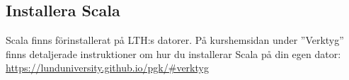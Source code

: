 \subsection{Installera Scala}

Scala finns förinstallerat på LTH:s datorer. På kurshemsidan under ''Verktyg'' finns detaljerade instruktioner om hur du installerar Scala på din egen dator:  \\ \url{https://lunduniversity.github.io/pgk/#verktyg}

%
%
%
%


